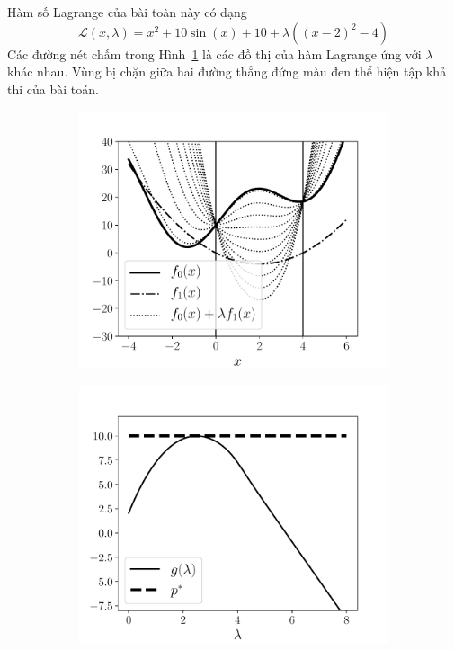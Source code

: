 Hàm số Lagrange của bài toàn này có dạng
\begin{equation*}
\mathcal{L}(x, \lambda) = x^2 + 10\sin(x) +10+ \lambda((x-2)^2 - 4)
\end{equation*}
Các đường nét chấm trong Hình~\ref{fig:18_dualitya} là các đồ thị của hàm Lagrange ứng với
$\lambda$ khác nhau. Vùng bị chặn giữa hai đường thẳng đứng màu đen thể
hiện tập khả thi của bài toán.
\begin{figure}[t]
\begin{subfigure}{0.48\textwidth}
\includegraphics[width=0.95\linewidth]{ebookML_src/src/duality/dual_func.pdf}
\caption{}
\label{fig:18_dualitya}
\end{subfigure}
\begin{subfigure}{0.48\textwidth}
\includegraphics[width=0.95\linewidth]{ebookML_src/src/duality/dual_func2.pdf}

\end{subfigure}
\end{figure}
